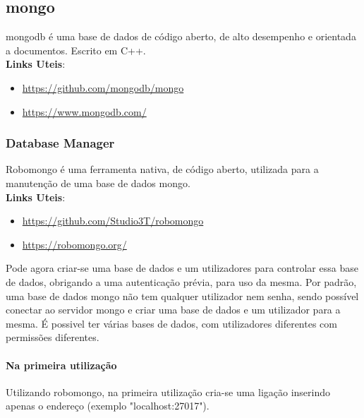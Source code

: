 \subsection{mongo}
mongodb é uma base de dados de código aberto, de alto desempenho e orientada a documentos. Escrito em C++.\newline \\
\textbf{Links Uteis}:
\begin{itemize}
\item \url{https://github.com/mongodb/mongo}
\item \url{https://www.mongodb.com/}
\end{itemize}

\subsubsection{Database Manager}
Robomongo é uma ferramenta nativa, de código aberto, utilizada para a manutenção de uma base de dados mongo.\newline \\
\textbf{Links Uteis}:
\begin{itemize}
\item \url{https://github.com/Studio3T/robomongo}
\item \url{https://robomongo.org/}
\end{itemize}
Pode agora criar-se uma base de dados e um utilizadores para controlar essa base de dados, obrigando a uma autenticação prévia, para uso da mesma.\newline
Por padrão, uma base de dados mongo não tem qualquer utilizador nem senha, sendo possível conectar ao servidor mongo e criar uma base de dados e um utilizador para a mesma. É possivel ter várias bases de dados, com utilizadores diferentes com permissões diferentes.
\paragraph{Na primeira utilização}
Utilizando robomongo, na primeira utilização cria-se uma ligação inserindo apenas o endereço (exemplo "localhost:27017").
